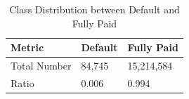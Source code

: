             \begin{center}
                \begin{table}[]
                    \centering
                    \begin{tabular}{|p{9.0cm}|p{2.5cm}|p{2.5cm}|}
                        \hline \textbf{Metric} & \textbf{Default} & \textbf{Fully Paid} \\ \hline \hline
        
                        Total Number & 84,745 & 15,214,584 \\ \hline
                        Ratio & 0.006 & 0.994 \\ \hline
                    \end{tabular}
                    \caption{Class Distribution between Default and Fully Paid} \vspace{0.5cm}
                    \label{table_class_dist}
                \end{table}
            \end{center}
            
        
        
